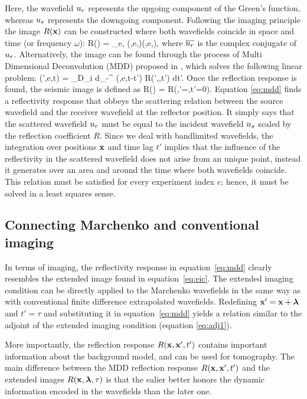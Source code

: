 Here, the wavefield $u_r$ represents the upgoing component of the Green's function, 
whereas $u_s$ represents the downgoing component. 
 Following the imaging principle \citep{unified} the image $R({\bf x})$ can be constructed 
where both wavefields coincide in space and time (or frequency $\omega$): 
\beq
  R(\xx) = \sum_{e,\omega}  \US(\xx,e,\omega)\overline{\UR}(\xx,e,\omega),
\eeq
where $\overline{u_r}$ is the complex conjugate of $u_r$. Alternatively, the 
image can be found through the process of Multi Dimensional Deconvolution (MDD) proposed in \cite{Joost},
which solves the following linear problem:
\beq
 \UR(\xx',e,t) = \int_{\partial D_i} d\xx \int_{-\infty}^{\infty}  \US(\xx,e,t-t') R(\xx',\xx,t') dt'.
\label{eq:mdd} 
\eeq
Once the reflection response is found, the seismic image is defined as  
\beq
R(\xx) = R(\xx,\xx'=\xx,t'=0). 
\eeq
Equation \ref{eq:mdd} finds a reflectivity response that obbeys the scattering relation between 
the source wavefield and the receiver wavefield at the reflector position. It simply says that
the scattered wavefield $u_r$ must be equal to the incident wavefield $u_s$ scaled by the 
reflection coefficient $R$. Since we deal with bandlimited wavefields, the integration over
positions ${\bf x}$ and  time lag $t'$ implies that the influence of the reflectivity in the
scattered wavefield does not arise from an unique point, instead it generates over an 
area and around the time where both wavefields coincide. This relation must be satisfied for
every experiment index $e$; hence, it must be solved in a least squares sense.  


\subsection{Connecting Marchenko and conventional imaging}

In terms of imaging, the reflectivity response in equation~\ref{eq:mdd} clearly resembles
the extended image found in equation~\ref{eq:eic}. The extended imaging condition can 
be directly applied to the Marchenko wavefields in the same way as with conventional
finite difference extrapolated wavefields.
 Redefining ${\bf x}' = {\bf x} + {\boldsymbol{\lambda}}$ and  $t'=\tau$ and substituting it in equation~\ref{eq:mdd} yields
a relation similar to the adjoint of the extended imaging condition (equation \ref{eq:adj1}).

More importantly, the reflection response $R({\bf x},{\bf x}',t')$ contains important information
about the background model, and can be used for tomography. The main difference between
the MDD reflection response $R({\bf x},{\bf x}',t')$ and the extended images $R({\bf x},{\boldsymbol{\lambda}},\tau)$ is that the ealier 
better honors the dynamic information encoded in the wavefields than the later one.  



